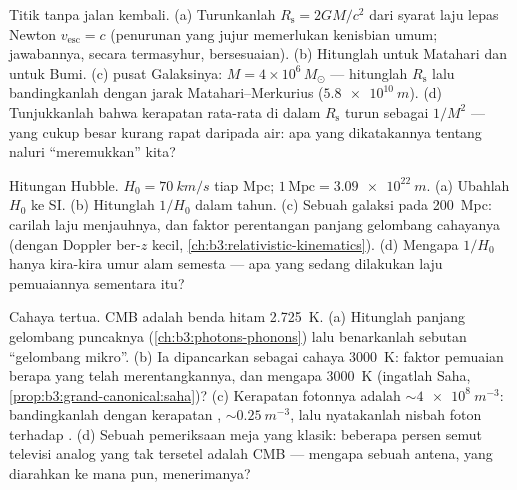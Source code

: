 \begin{exercise}[$\star\star$]\label{exo:b3:astrophysics:8}
Titik tanpa jalan kembali. (a) Turunkanlah $R_{\text{s}} = 2GM/c^2$ dari
syarat laju lepas Newton $v_{\text{esc}} = c$ (penurunan
yang jujur memerlukan kenisbian umum; jawabannya, secara termasyhur,
bersesuaian). (b) Hitunglah untuk Matahari dan untuk Bumi.
(c)  pusat Galaksinya: $M = 4\times10^6\,M_\odot$
--- hitunglah $R_{\text{s}}$ lalu bandingkanlah dengan jarak
Matahari--Merkurius ($\qty{5.8e10}{m}$). (d) Tunjukkanlah bahwa kerapatan rata-rata di dalam
$R_{\text{s}}$ turun sebagai $1/M^2$ ---  yang cukup besar
kurang rapat daripada air: apa yang dikatakannya tentang naluri
``meremukkan'' kita?
\end{exercise}

\begin{exercise}[$\star\star\star$]\label{exo:b3:astrophysics:9}
Hitungan Hubble. $H_0 = \qty{70}{km/s}$ tiap Mpc; $1\,
\text{Mpc} = \qty{3.09e22}{m}$. (a) Ubahlah $H_0$ ke SI. (b)
Hitunglah $1/H_0$ dalam tahun. (c) Sebuah galaksi pada \qty{200}{Mpc}: carilah
laju menjauhnya, dan faktor perentangan panjang gelombang cahayanya
(dengan Doppler ber-$z$ kecil,
\cref{ch:b3:relativistic-kinematics}). (d) Mengapa $1/H_0$ hanya
kira-kira umur alam semesta --- apa yang sedang dilakukan laju
pemuaiannya sementara itu?
\end{exercise}

\begin{exercise}[$\star\star\star$]\label{exo:b3:astrophysics:10}
Cahaya tertua. CMB adalah benda hitam \qty{2.725}{K}. (a)
Hitunglah panjang gelombang puncaknya (\cref{ch:b3:photons-phonons}) lalu
benarkanlah sebutan ``gelombang mikro''. (b) Ia dipancarkan sebagai
cahaya \qty{3000}{K}: faktor pemuaian berapa yang telah merentangkannya,
dan mengapa \qty{3000}{K} (ingatlah Saha,
\cref{prop:b3:grand-canonical:saha})? (c) Kerapatan fotonnya adalah
$\sim\qty{4e8}{m^{-3}}$: bandingkanlah dengan kerapatan ,
$\sim\qty{0.25}{m^{-3}}$, lalu nyatakanlah nisbah foton terhadap .
(d) Sebuah pemeriksaan meja yang klasik: beberapa persen semut televisi analog
yang tak tersetel adalah CMB --- mengapa sebuah antena, yang diarahkan
ke mana pun, menerimanya?
\end{exercise}

